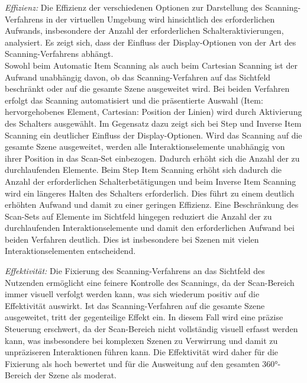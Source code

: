 \textit{Effizienz:}
Die Effizienz der verschiedenen Optionen zur Darstellung des Scanning-Verfahrens in der virtuellen Umgebung wird hinsichtlich des erforderlichen Aufwands, insbesondere der Anzahl der erforderlichen Schalteraktivierungen, analysiert. Es zeigt sich, dass der Einfluss der Display-Optionen von der Art des Scanning-Verfahrens abhängt.\\
Sowohl beim Automatic Item Scanning als auch beim Cartesian Scanning ist der Aufwand unabhängig davon, ob das Scanning-Verfahren auf das Sichtfeld beschränkt oder auf die gesamte Szene ausgeweitet wird. Bei beiden Verfahren erfolgt das Scanning automatisiert und die präsentierte Auswahl (Item: hervorgehobenes Element, Cartesian: Position der Linien) wird durch Aktivierung des Schalters ausgewählt. Im Gegensatz dazu zeigt sich bei Step und Inverse Item Scanning ein deutlicher Einfluss der Display-Optionen. Wird das Scanning auf die gesamte Szene ausgeweitet, werden alle Interaktionselemente unabhängig von ihrer Position in das Scan-Set einbezogen. Dadurch erhöht sich die Anzahl der zu durchlaufenden Elemente. Beim Step Item Scanning erhöht sich dadurch die Anzahl der erforderlichen Schalterbetätigungen und beim Inverse Item Scanning wird ein längeres Halten des Schalters erforderlich. Dies führt zu einem deutlich erhöhten Aufwand und damit zu einer geringen Effizienz. Eine Beschränkung des Scan-Sets auf Elemente im Sichtfeld hingegen reduziert die Anzahl der zu durchlaufenden Interaktionselemente und damit den erforderlichen Aufwand bei beiden Verfahren deutlich. Dies ist insbesondere bei Szenen mit vielen Interaktionselementen entscheidend. 

\textit{Effektivität:}
Die Fixierung des Scanning-Verfahrens an das Sichtfeld des Nutzenden ermöglicht eine feinere Kontrolle des Scannings, da der Scan-Bereich immer visuell verfolgt werden kann, was sich wiederum positiv auf die Effektivität auswirkt. Ist das Scanning-Verfahren auf die gesamte Szene ausgeweitet, tritt der gegenteilige Effekt ein. In diesem Fall wird eine präzise Steuerung erschwert, da der Scan-Bereich nicht vollständig visuell erfasst werden kann, was insbesondere bei komplexen Szenen zu Verwirrung und damit zu unpräziseren Interaktionen führen kann. Die Effektivität wird daher für die Fixierung als hoch bewertet und für die Ausweitung auf den gesamten 360°-Bereich der Szene als moderat. 

